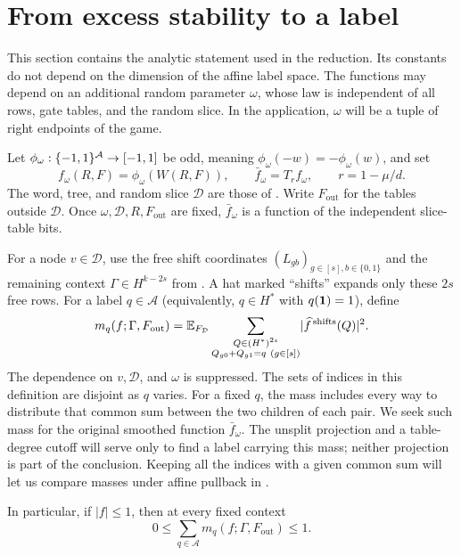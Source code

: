 \section{From excess stability to a label}\label{sec:extraction}

This section contains the analytic statement used in the reduction. Its
constants do not depend on the dimension of the affine label space.
The functions may depend on an additional random parameter $\omega$, whose
law is independent of all rows, gate tables, and the random slice. In the application,
$\omega$ will be a tuple of right endpoints of the game.

Let $\phi_\omega:\{-1,1\}^{\mathcal A}\to[-1,1]$ be odd, meaning
$\phi_\omega(-w)=-\phi_\omega(w)$, and set
\[
 f_\omega(R,F)=\phi_\omega(W(R,F)),\qquad
 \bar f_\omega=T_r f_\omega,\qquad r=1-\mu/d.
\]
The word, tree, and random slice $\mathcal D$ are those of
. Write $F_{\mathrm{out}}$ for the tables outside
$\mathcal D$. Once $\omega,\mathcal D,R,F_{\mathrm{out}}$ are fixed,
$\bar f_\omega$ is a function of the independent slice-table bits.

For a node $v\in\mathcal D$, use the free shift coordinates
$(L_{gb})_{g\in[s],b\in\{0,1\}}$ and the remaining context
$\Gamma\in H^{k-2s}$ from . A hat marked
``shifts'' expands only these $2s$ free rows. For a label $q\in\mathcal A$
(equivalently, $q\in H^*$ with $q(\mathbf 1)=1$),
define
\begin{equation}\label{eq:mass}
 m_q(f;\Gamma,F_{\mathrm{out}})
 =\mathbb E_{F_{\mathcal D}}
 \sum_{\substack{Q\in(H^*)^{2s}\\
                  Q_{g0}+Q_{g1}=q\ (g\in[s])}}
 \lvert\widehat f^{\,\mathrm{shifts}}(Q)\rvert^2.
\end{equation}
The dependence on $v,\mathcal D$, and $\omega$ is suppressed. The sets of
indices in this definition are disjoint as $q$ varies. For a fixed $q$,
the mass includes every way to distribute that common sum between the
two children of each pair. We seek such mass for the original smoothed
function $\bar f_\omega$. The unsplit projection and a table-degree
cutoff will serve only to find a label carrying this mass; neither
projection is part of the conclusion. Keeping all the indices with a
given common sum will let us compare masses under affine pullback in
.

In particular, if
$|f|\le1$, then at every fixed context
\begin{equation}\label{eq:mass-bound}
 0\le\sum_{q\in\mathcal A}m_q(f;\Gamma,F_{\mathrm{out}})\le1.
\end{equation}


